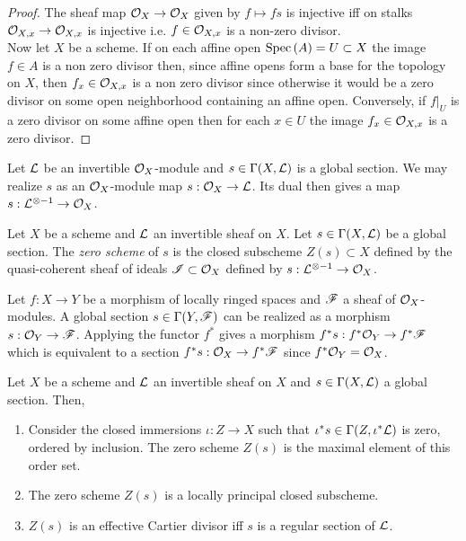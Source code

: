 \documentclass[12pt]{article}
\begin{document}
\begin{proof}
The sheaf map $\mathcal{O}_{X} \to \mathcal{O}_{X}$ given by $f \mapsto fs$ is injective iff on stalks $\mathcal{O}_{X, x} \to \mathcal{O}_{X, x}$ is injective i.e. $f \in \mathcal{O}_{X, x}$ is a non-zero divisor. 
\bigskip\\
Now let $X$ be a scheme. If on each affine open $\mathrm{Spec}\left( A \right) = U \subset X$ the image $f \in A$ is a non zero divisor then, since affine opens form a base for the topology on $X$, then $f_x \in \mathcal{O}_{X, x}$ is a non zero divisor since otherwise it would be a zero divisor on some open neighborhood containing an affine open. Conversely, if $f |_U$ is a zero divisor on some affine open then for each $x \in U$ the image $f_x \in \mathcal{O}_{X, x}$ is a zero divisor.
\end{proof}

\begin{remark}
Let $\mathcal{L}$ be an invertible $\mathcal{O}_{X}$-module and $s \in \Gamma(X, \mathcal{L})$ is a global section. We may realize $s$ as an $\mathcal{O}_{X}$-module map $s : \mathcal{O}_{X} \to \mathcal{L}$. Its dual then gives a map $s : \mathcal{L}^{\otimes - 1} \to \mathcal{O}_{X}$. 
\end{remark}

\begin{definition}
Let $X$ be a scheme and $\mathcal{L}$ an invertible sheaf on $X$. Let $s \in \Gamma(X, \mathcal{L})$ be a global section. The \textit{zero scheme} of $s$ is the closed subscheme $Z(s) \subset X$ defined by the quasi-coherent sheaf of ideals $\mathscr{I} \subset \mathcal{O}_{X}$ defined by $s : \mathcal{L}^{\otimes -1} \to \mathcal{O}_{X}$. 
\end{definition}

\begin{remark}
Let $f : X \to Y$ be a morphism of locally ringed spaces and $\mathscr{F}$ a sheaf of $\mathcal{O}_{X}$-modules. A global section $s \in \Gamma(Y, \mathscr{F})$ can be realized as a morphism $s : \mathcal{O}_{Y} \to \mathscr{F}$. Applying the functor $f^*$ gives a morphism $f^* s : f^* \mathcal{O}_{Y} \to f^* \mathscr{F}$ which is equivalent to a section $f^* s : \mathcal{O}_{X} \to f^* \mathscr{F}$ since $f^* \mathcal{O}_{Y} = \mathcal{O}_{X}$. 
\end{remark}

\begin{lemma}
Let $X$ be a scheme and $\mathcal{L}$ an invertible sheaf on $X$ and $s \in \Gamma(X, \mathcal{L})$ a global section. Then,
\begin{enumerate}
\item Consider the closed immersions $\iota : Z \to X$ such that $\iota^* s \in \Gamma(Z, \iota^* \mathcal{L})$ is zero, ordered by inclusion. The zero scheme $Z(s)$ is the maximal element of this order set.
\item The zero scheme $Z(s)$ is a locally principal closed subscheme.
\item $Z(s)$ is an effective Cartier divisor iff $s$ is a regular section of $\mathcal{L}$.
\end{enumerate}
\end{lemma}
\end{document}
